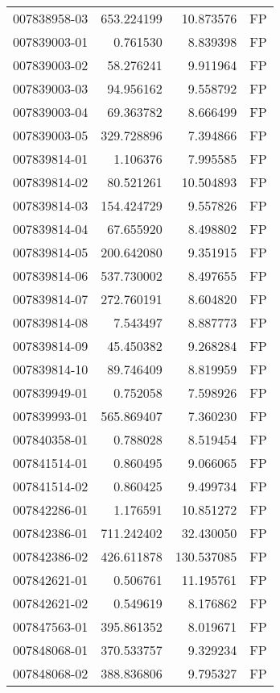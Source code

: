 \begin{tabular}{lrrl}
007838958-03 &  653.224199 &    10.873576 &   FP \\
007839003-01 &    0.761530 &     8.839398 &   FP \\
007839003-02 &   58.276241 &     9.911964 &   FP \\
007839003-03 &   94.956162 &     9.558792 &   FP \\
007839003-04 &   69.363782 &     8.666499 &   FP \\
007839003-05 &  329.728896 &     7.394866 &   FP \\
007839814-01 &    1.106376 &     7.995585 &   FP \\
007839814-02 &   80.521261 &    10.504893 &   FP \\
007839814-03 &  154.424729 &     9.557826 &   FP \\
007839814-04 &   67.655920 &     8.498802 &   FP \\
007839814-05 &  200.642080 &     9.351915 &   FP \\
007839814-06 &  537.730002 &     8.497655 &   FP \\
007839814-07 &  272.760191 &     8.604820 &   FP \\
007839814-08 &    7.543497 &     8.887773 &   FP \\
007839814-09 &   45.450382 &     9.268284 &   FP \\
007839814-10 &   89.746409 &     8.819959 &   FP \\
007839949-01 &    0.752058 &     7.598926 &   FP \\
007839993-01 &  565.869407 &     7.360230 &   FP \\
007840358-01 &    0.788028 &     8.519454 &   FP \\
007841514-01 &    0.860495 &     9.066065 &   FP \\
007841514-02 &    0.860425 &     9.499734 &   FP \\
007842286-01 &    1.176591 &    10.851272 &   FP \\
007842386-01 &  711.242402 &    32.430050 &   FP \\
007842386-02 &  426.611878 &   130.537085 &   FP \\
007842621-01 &    0.506761 &    11.195761 &   FP \\
007842621-02 &    0.549619 &     8.176862 &   FP \\
007847563-01 &  395.861352 &     8.019671 &   FP \\
007848068-01 &  370.533757 &     9.329234 &   FP \\
007848068-02 &  388.836806 &     9.795327 &   FP \\

\end{tabular}

